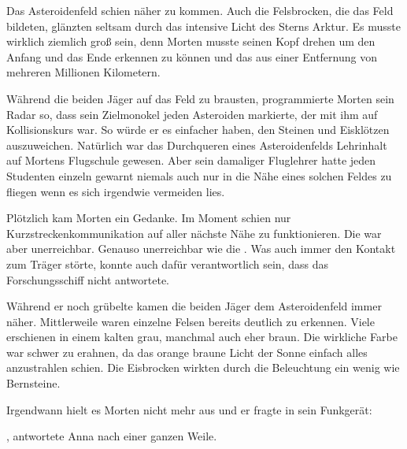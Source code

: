 \par

Das Asteroidenfeld schien näher zu kommen. Auch die Felsbrocken, die das Feld bildeten, glänzten seltsam durch das intensive Licht des Sterns Arktur. Es musste wirklich ziemlich groß sein, denn Morten musste seinen Kopf drehen um den Anfang und das Ende erkennen zu können und das aus einer Entfernung von mehreren Millionen Kilometern.

\par

Während die beiden Jäger auf das Feld zu brausten, programmierte Morten sein Radar so, dass sein Zielmonokel jeden Asteroiden markierte, der mit ihm auf Kollisionskurs war. So würde er es einfacher haben, den Steinen und Eisklötzen auszuweichen. Natürlich war das Durchqueren eines Asteroidenfelds Lehrinhalt auf Mortens Flugschule gewesen. Aber sein damaliger Fluglehrer hatte jeden Studenten einzeln gewarnt niemals auch nur in die Nähe eines solchen Feldes zu fliegen wenn es sich irgendwie vermeiden lies.

\par

Plötzlich kam Morten ein Gedanke. Im Moment schien nur Kurzstreckenkommunikation auf aller nächste Nähe zu funktionieren. Die  war aber unerreichbar. Genauso unerreichbar wie die . Was auch immer den Kontakt zum Träger störte, konnte auch dafür verantwortlich sein, dass das Forschungsschiff nicht antwortete.

\par

Während er noch grübelte kamen die beiden Jäger dem Asteroidenfeld immer näher. Mittlerweile waren einzelne Felsen bereits deutlich zu erkennen. Viele  erschienen in einem kalten grau, manchmal auch eher braun. Die wirkliche Farbe war schwer zu erahnen, da das orange braune Licht der Sonne einfach alles anzustrahlen schien. Die Eisbrocken wirkten durch die Beleuchtung ein wenig wie Bernsteine.

\par

Irgendwann hielt es Morten nicht mehr aus und er fragte in sein Funkgerät: 

\par

, antwortete Anna nach einer ganzen Weile. 


